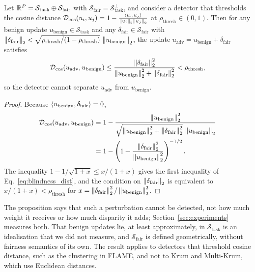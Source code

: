 \begin{proposition}
\label{prop:subspace_blindness}
Let $\mathbb{R}^P = \mathcal{S}_{\mathrm{task}} \oplus \mathcal{S}_{\mathrm{fair}}$ with $\mathcal{S}_{\mathrm{fair}} = \mathcal{S}_{\mathrm{task}}^\perp$, and consider a detector that thresholds the cosine distance $\mathcal{D}_{\mathrm{cos}}(u_i, u_j) = 1 - \frac{\langle u_i, u_j \rangle}{\left\lVert u_i \right\rVert_2 \left\lVert u_j \right\rVert_2}$ at $\rho_{\mathrm{thresh}} \in (0, 1)$. Then for any benign update $u_{\mathrm{benign}} \in \mathcal{S}_{\mathrm{task}}$ and any $\delta_{\mathrm{fair}} \in \mathcal{S}_{\mathrm{fair}}$ with $\left\lVert \delta_{\mathrm{fair}} \right\rVert_2 < \sqrt{\rho_{\mathrm{thresh}}/(1 - \rho_{\mathrm{thresh}})}\, \left\lVert u_{\mathrm{benign}} \right\rVert_2$, the update $u_{\mathrm{adv}} = u_{\mathrm{benign}} + \delta_{\mathrm{fair}}$ satisfies
\begin{equation}
\label{eq:blindness_dist}
\mathcal{D}_{\mathrm{cos}}(u_{\mathrm{adv}}, u_{\mathrm{benign}}) \le \frac{\left\lVert \delta_{\mathrm{fair}} \right\rVert_2^2}{\left\lVert u_{\mathrm{benign}} \right\rVert_2^2 + \left\lVert \delta_{\mathrm{fair}} \right\rVert_2^2} < \rho_{\mathrm{thresh}},
\end{equation}
so the detector cannot separate $u_{\mathrm{adv}}$ from $u_{\mathrm{benign}}$.
\end{proposition}
\begin{proof}
Because $\langle u_{\mathrm{benign}}, \delta_{\mathrm{fair}} \rangle = 0$,
\begin{align*}
\mathcal{D}_{\mathrm{cos}}(u_{\mathrm{adv}}, u_{\mathrm{benign}})
&= 1 - \frac{\left\lVert u_{\mathrm{benign}} \right\rVert_2^2}{\sqrt{\left\lVert u_{\mathrm{benign}} \right\rVert_2^2 + \left\lVert \delta_{\mathrm{fair}} \right\rVert_2^2}\, \left\lVert u_{\mathrm{benign}} \right\rVert_2} \\
&= 1 - \left(1 + \frac{\left\lVert \delta_{\mathrm{fair}} \right\rVert_2^2}{\left\lVert u_{\mathrm{benign}} \right\rVert_2^2}\right)^{-1/2}.
\end{align*}
The inequality $1 - 1/\sqrt{1+x} \le x/(1+x)$ gives the first inequality of Eq.~\eqref{eq:blindness_dist}, and the condition on $\left\lVert \delta_{\mathrm{fair}} \right\rVert_2$ is equivalent to $x/(1+x) < \rho_{\mathrm{thresh}}$ for $x = \left\lVert \delta_{\mathrm{fair}} \right\rVert_2^2/\left\lVert u_{\mathrm{benign}} \right\rVert_2^2$.
\end{proof}

\begin{remark}[Scope]
\label{rem:subspace_blindness_scope}
The proposition says that such a perturbation cannot be detected, not how much weight it receives or how much disparity it adds; Section~\ref{sec:experiments} measures both. That benign updates lie, at least approximately, in $\mathcal{S}_{\mathrm{task}}$ is an idealisation that we did not measure, and $\mathcal{S}_{\mathrm{fair}}$ is defined geometrically, without fairness semantics of its own. The result applies to detectors that threshold cosine distance, such as the clustering in FLAME, and not to Krum and Multi-Krum, which use Euclidean distances.
\end{remark}

